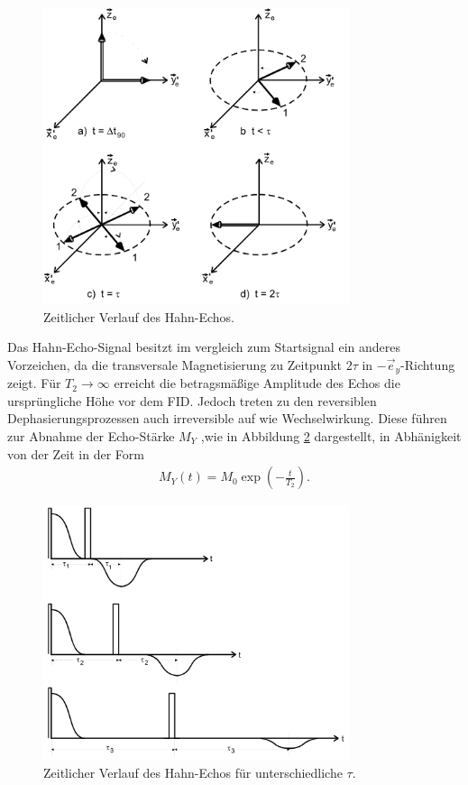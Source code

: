 \begin{itemize}
\begin{figure}
  \includegraphics[width=0.8\textwidth]{spin-echo.PNG}
  \caption{Zeitlicher Verlauf des Hahn-Echos.}
  \label{fig:spin-echo}
\end{figure}

Das Hahn-Echo-Signal besitzt im vergleich zum Startsignal
ein anderes Vorzeichen, da die transversale
Magnetisierung zu Zeitpunkt $2\tau$ in $-\vec{e}_y$-Richtung zeigt.
Für $T_2\rightarrow\infty$ erreicht die betragsmäßige
Amplitude des Echos die
ursprüngliche Höhe vor dem FID.
Jedoch treten zu den reversiblen Dephasierungsprozessen auch
irreversible auf wie Wechselwirkung. Diese führen zur Abnahme der Echo-Stärke $M_Y$
,wie in Abbildung \ref{fig:tau_ver} dargestellt,
in Abhänigkeit von der Zeit in der Form
\begin{align}
  M_Y(t)=M_0 \exp\left(-\frac{t}{T_2}\right).\label{eqn:t2}
\end{align}

\begin{figure}
  \includegraphics[width=0.8\textwidth]{tau_ver.PNG}
  \caption{Zeitlicher Verlauf des Hahn-Echos für unterschiedliche $\tau$.}
  \label{fig:tau_ver}
\end{figure}


\end{itemize}
